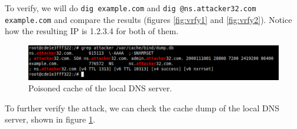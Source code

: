\documentclass[12pt,reqno]{amsart}
\newcommand{\code}[1]{\texttt{#1}}
\begin{document}
  
To verify, we will do \code{dig example.com} and \code{dig @ns.attacker32.com example.com} and compare the results (figures \ref{fig:vrfy1} and \ref{fig:vrfy2}). Notice how the resulting IP is 1.2.3.4 for both of them.
 
     \begin{figure}[h]
\includegraphics[width=\linewidth]{screenshots/LOCAL_POISONED.png}
\caption{Poisoned cache of the local DNS server.}
\label{fig:pois}
\end{figure}

To further verify the attack, we can check the cache dump of the local DNS server, shown in figure \ref{fig:pois}.
 

  
\end{document}
